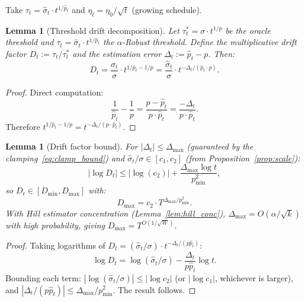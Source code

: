 \documentclass[11pt]{article}
\newtheorem{lemma}[theorem]{Lemma}
\theoremstyle{definition}
\newcommand{\abs}[1]{\left| #1 \right|}
\newcommand{\phat}{\hat{p}}
\newcommand{\shat}{\hat{\sigma}}
\begin{document}
Take $\tau_t = \shat_t \cdot t^{1/\phat_t}$ and $\eta_t = \eta_0/\sqrt{t}$ (growing schedule).

\begin{lemma}[Threshold drift decomposition]\label{lem:drift}
Let $\tau_t^* = \sigma \cdot t^{1/p}$ be the oracle threshold and
$\tau_t = \shat_t \cdot t^{1/\phat_t}$ the $\alpha$-Robust threshold.
Define the multiplicative drift factor $D_t := \tau_t / \tau_t^*$ and the
estimation error $\Delta_t := \phat_t - p$. Then:
\begin{equation}
  D_t = \frac{\shat_t}{\sigma} \cdot t^{1/\phat_t - 1/p}
  = \frac{\shat_t}{\sigma} \cdot t^{-\Delta_t/(\phat_t \cdot p)}.
\end{equation}
\end{lemma}

\begin{proof}
Direct computation:
\[
  \frac{1}{\phat_t} - \frac{1}{p}
  = \frac{p - \phat_t}{p \cdot \phat_t}
  = \frac{-\Delta_t}{p \cdot \phat_t}.
\]
Therefore $t^{1/\phat_t - 1/p} = t^{-\Delta_t/(p \cdot \phat_t)}$.
\end{proof}

\begin{lemma}[Drift factor bound]\label{lem:drift_bound}
For $\abs{\Delta_t} \leq \Delta_{\max}$ (guaranteed by the clamping~\eqref{eq:clamp_bound})
and $\shat_t/\sigma \in [c_1, c_2]$ (from Proposition~\ref{prop:scale}):
\[
  \abs{\log D_t} \leq \abs{\log(c_2)} + \frac{\Delta_{\max} \log t}{p_{\min}^2},
\]
so $D_t \in [D_{\min}, D_{\max}]$ with:
\begin{equation}\label{eq:Dmax}
  D_{\max} = c_2 \cdot T^{\Delta_{\max}/p_{\min}^2}.
\end{equation}
With Hill estimator concentration (Lemma~\ref{lem:hill_conc}),
$\Delta_{\max} = O(\alpha/\sqrt{k})$ with high probability, giving
$D_{\max} = T^{O(1/\sqrt{W})}$.
\end{lemma}

\begin{proof}
Taking logarithms of $D_t = (\shat_t/\sigma) \cdot t^{-\Delta_t/(p\phat_t)}$:
\[
  \log D_t = \log(\shat_t/\sigma) - \frac{\Delta_t}{p\phat_t}\log t.
\]
Bounding each term: $\abs{\log(\shat_t/\sigma)} \leq \abs{\log c_2}$
(or $\abs{\log c_1}$, whichever is larger), and
$\abs{\Delta_t/(p\phat_t)} \leq \Delta_{\max}/p_{\min}^2$. The result follows.
\end{proof}
\end{document}
